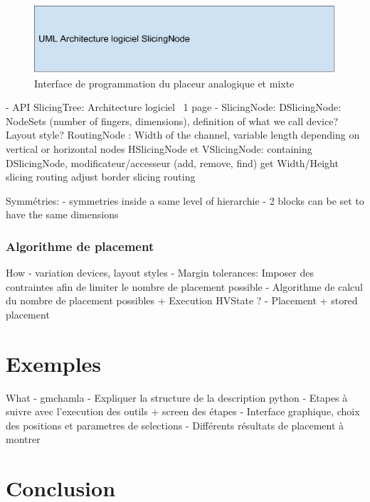 \begin{figure}[h]
\begin{center}
\includegraphics[height=0.11\textheight]{Figures/11.pdf}
\caption{Interface de programmation du placeur analogique et mixte}
\label{fig:11}
\end{center}
\end{figure} 
- API SlicingTree: Architecture logiciel ~1 page
- SlicingNode: 
DSlicingNode: NodeSets (number of fingers, dimensions), definition of what we call device? Layout style?
RoutingNode : Width of the channel, variable length depending on vertical or horizontal nodes
HSlicingNode et VSlicingNode: containing DSlicingNode, modificateur/accesseur (add, remove, find)
get Width/Height
slicing routing
adjust border slicing routing

Symmétries:
- symmetries inside a same level of hierarchie
- 2 blocks can be set to have the same dimensions

\subsubsection{Algorithme de placement}

How
- variation devices, layout styles
- Margin tolerances: Imposer des contraintes afin de limiter le nombre de placement possible
- Algorithme de calcul du nombre de placement possibles + Execution HVState ?
- Placement + stored placement

\section{Exemples}
\label{sec:Placement-Exemple}
What
- gmchamla
- Expliquer la structure de la description python
- Etapes à suivre avec l'execution des outils + screen des étapes
- Interface graphique, choix des positions et parametres de selections
- Différents résultats de placement à montrer
\section{Conclusion}